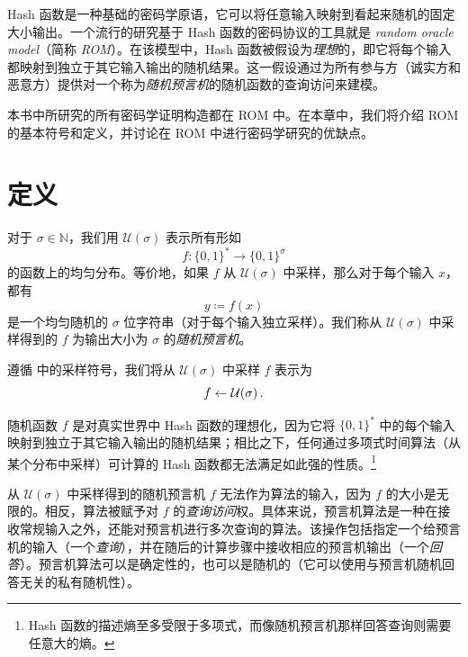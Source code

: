 \documentclass[american,singlepageview]{snargs-book-zh}
\renewcommand{\enspace}{\ensuremath{\thinspace}}
\newcommand{\Bits}{\{0,1\}}
\newcommand{\DefineEqual}{\coloneqq}
\newcommand{\Naturals}{\mathbb{N}}
\newcommand{\ROFunction}{f}
\newcommand{\RODistribution}[1]{\mathcal{U}(#1)}
\newcommand{\ROQuery}{x}
\newcommand{\ROAnswer}{y}
\newcommand{\ROOutputSize}{\sigma}
\begin{document}
Hash 函数是一种基础的密码学原语，它可以将任意输入映射到看起来随机的固定大小输出。一个流行的研究基于 Hash 函数的密码协议的工具就是 \emph{random oracle model}（简称 \emph{ROM}）。在该模型中，Hash 函数被假设为\emph{理想}的，即它将每个输入都映射到独立于其它输入输出的随机结果。这一假设通过为所有参与方（诚实方和恶意方）提供对一个称为\emph{随机预言机}的随机函数的查询访问来建模。

本书中所研究的所有密码学证明构造都在 ROM 中。在本章中，我们将介绍 ROM 的基本符号和定义，并讨论在 ROM 中进行密码学研究的优缺点。

\section{定义}
\label{section:rom-definition}

对于 $\ROOutputSize \in \Naturals$，我们用 $\RODistribution{\ROOutputSize}$ 表示所有形如
$$
\ROFunction \colon \Bits^{*} \to \Bits^{\ROOutputSize}
$$
的函数上的均匀分布。等价地，如果 $\ROFunction$ 从 $\RODistribution{\ROOutputSize}$ 中采样，那么对于每个输入 $\ROQuery$，都有
$$
\ROAnswer \DefineEqual \ROFunction(\ROQuery)
$$
是一个均匀随机的 $\ROOutputSize$ 位字符串（对于每个输入独立采样）。我们称从 $\RODistribution{\ROOutputSize}$ 中采样得到的 $\ROFunction$ 为输出大小为 $\ROOutputSize$ 的\emph{随机预言机}。

遵循 中的采样符号，我们将从 $\RODistribution{\ROOutputSize}$ 中采样 $\ROFunction$ 表示为
\begin{equation*}
\ROFunction \gets \RODistribution{\ROOutputSize}
\enspace.
\end{equation*}

随机函数 $\ROFunction$ 是对真实世界中 Hash 函数的理想化，因为它将 $\Bits^{*}$ 中的每个输入映射到独立于其它输入输出的随机结果；相比之下，任何通过多项式时间算法（从某个分布中采样）可计算的 Hash 函数都无法满足如此强的性质。\footnote{Hash 函数的描述熵至多受限于多项式，而像随机预言机那样回答查询则需要任意大的熵。}

从 $\RODistribution{\ROOutputSize}$ 中采样得到的随机预言机 $\ROFunction$ 无法作为算法的输入，因为 $\ROFunction$ 的大小是无限的。相反，算法被赋予对 $\ROFunction$ 的\emph{查询访问}权。具体来说，预言机算法是一种在接收常规输入之外，还能对预言机进行多次查询的算法。该操作包括指定一个给预言机的输入（一个\emph{查询}），并在随后的计算步骤中接收相应的预言机输出（一个\emph{回答}）。预言机算法可以是确定性的，也可以是随机的（它可以使用与预言机随机回答无关的私有随机性）。
\end{document}
